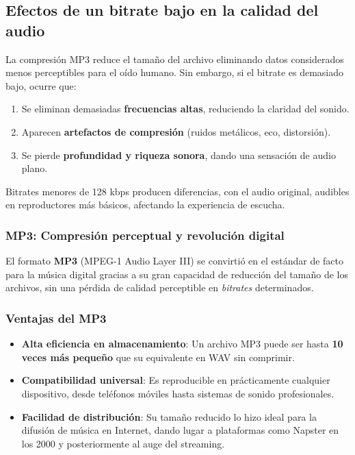 \subsection{Efectos de un bitrate bajo en la calidad del audio}
La compresión MP3 reduce el tamaño del archivo eliminando datos considerados menos perceptibles para el oído humano. Sin embargo, si el bitrate es demasiado bajo, ocurre que:

\begin{enumerate}
    \item Se eliminan demasiadas \textbf{frecuencias altas}, reduciendo la claridad del sonido.
    \item Aparecen \textbf{artefactos de compresión} (ruidos metálicos, eco, distorsión).
    \item Se pierde \textbf{profundidad y riqueza sonora}, dando una sensación de audio plano.
\end{enumerate}

Bitrates menores de 128 kbps producen diferencias, con el audio original, audibles en reproductores más básicos, afectando la experiencia de escucha.

\subsubsection{MP3: Compresión perceptual y revolución digital}

El formato \textbf{MP3} (MPEG-1 Audio Layer III) se convirtió en el estándar de facto para la música digital gracias a su gran capacidad de reducción del tamaño de los archivos, sin una pérdida de calidad perceptible en \emph{bitrates} determinados.

\subsubsection{Ventajas del MP3}
\begin{itemize}
    \item \textbf{Alta eficiencia en almacenamiento}: Un archivo MP3 puede ser hasta \textbf{10 veces más pequeño} que su equivalente en WAV sin comprimir.
    \item \textbf{Compatibilidad universal}: Es reproducible en prácticamente cualquier dispositivo, desde teléfonos móviles hasta sistemas de sonido profesionales.
    \item \textbf{Facilidad de distribución}: Su tamaño reducido lo hizo ideal para la difusión de música en Internet, dando lugar a plataformas como Napster en los 2000 y posteriormente al auge del streaming.
\end{itemize}

